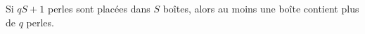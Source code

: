 Si $qS + 1$ perles sont placées dans $S$ boîtes, alors au moins une boîte
contient plus de $q$ perles.
